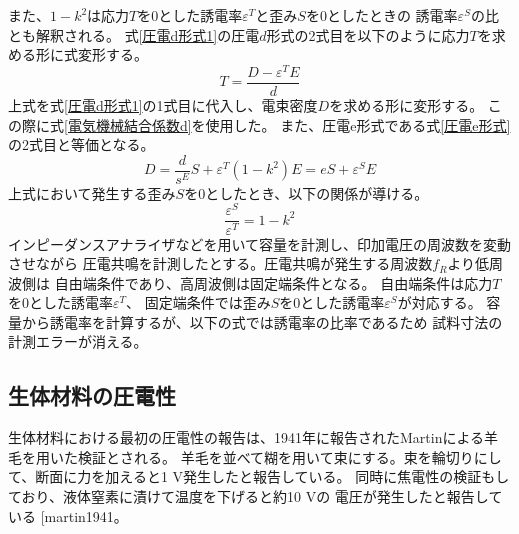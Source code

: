 \documentclass[dvipdfmx,12pt,a4paper]{jreport}
\makeatletter
\DeclareRobustCommand\cite{\unskip
    	\@ifnextchar[{\@tempswatrue\@citex}{\@tempswafalse\@citex[]}}
\makeatother
\begin{document}
			また、$1-k^2$は応力$T$を0とした誘電率$\varepsilon^T$と歪み$S$を0としたときの
			誘電率$\varepsilon^S$の比とも解釈される。
			式\eqref{圧電d形式1}の圧電$d$形式の2式目を以下のように応力$T$を求める形に式変形する。			
			\begin{equation}
				T = \frac{D-\varepsilon^T E}{d}
			\end{equation}
			上式を式\eqref{圧電d形式1}の1式目に代入し、電束密度$D$を求める形に変形する。
			この際に式\eqref{電気機械結合係数d}を使用した。
			また、圧電e形式である式\eqref{圧電e形式}の2式目と等価となる。
			\begin{equation}
				D = \frac{d}{s^E}S + \varepsilon^T\left(1-k^2\right)E
				  = e S + \varepsilon^S E
			\end{equation}
			上式において発生する歪み$S$を0としたとき、以下の関係が導ける。
			\begin{equation}
				\frac{\varepsilon^S}{\varepsilon^T}=1-k^2
			\end{equation}
			インピーダンスアナライザなどを用いて容量を計測し、印加電圧の周波数を変動させながら
			圧電共鳴を計測したとする。圧電共鳴が発生する周波数$f_R$より低周波側は
			自由端条件であり、高周波側は固定端条件となる。
			自由端条件は応力$T$を0とした誘電率$\varepsilon^T$、
			固定端条件では歪み$S$を0とした誘電率$\varepsilon^S$が対応する。
			容量から誘電率を計算するが、以下の式では誘電率の比率であるため
			試料寸法の計測エラーが消える。

			\newpage
			\subsection{生体材料の圧電性}
			生体材料における最初の圧電性の報告は、1941年に報告されたMartinによる羊毛を用いた検証とされる。
			羊毛を並べて糊を用いて束にする。束を輪切りにして、断面に力を加えると1 V発生したと報告している。
			同時に焦電性の検証もしており、液体窒素に漬けて温度を下げると約10 Vの
			電圧が発生したと報告している\cite{martin1941}。
\end{document}
